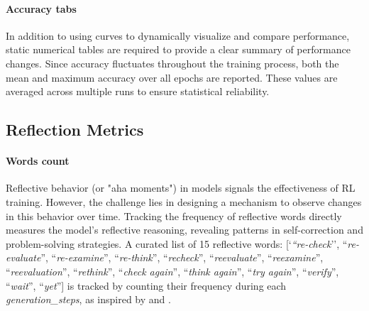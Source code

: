 \documentclass{article} %
\begin{document}
\paragraph{Accuracy tabs}
In addition to using curves to dynamically visualize and compare performance, static numerical tables are required to provide a clear summary of performance changes.
%
Since accuracy fluctuates throughout the training process, both the mean and maximum accuracy over all epochs are reported. These values are averaged across multiple runs to ensure statistical reliability.

\subsection{Reflection Metrics}
%
\paragraph{Words count}
%
Reflective behavior (or "aha moments") in models signals the effectiveness of RL training. However, the challenge lies in designing a mechanism to observe changes in this behavior over time.
%
Tracking the frequency of reflective words directly measures the model's reflective reasoning, revealing patterns in self-correction and problem-solving strategies.
%
A curated list of 15 reflective words: [`\textit{``re-check}'', ``\textit{re-evaluate}'', ``\textit{re-examine}'', ``\textit{re-think}'', ``\textit{recheck}'', ``\textit{reevaluate}'', ``\textit{reexamine}'', ``\textit{reevaluation}'', ``\textit{rethink}'', ``\textit{check again}'', ``\textit{think again}'', ``\textit{try again}'', ``\textit{verify}'', ``\textit{wait}'', ``\textit{yet}''] is tracked by counting their frequency during each \textit{generation\_steps}, as inspired by \cite{deepscaler2025} and \cite{xie2025logicrlunleashingllmreasoning}.
\end{document}
